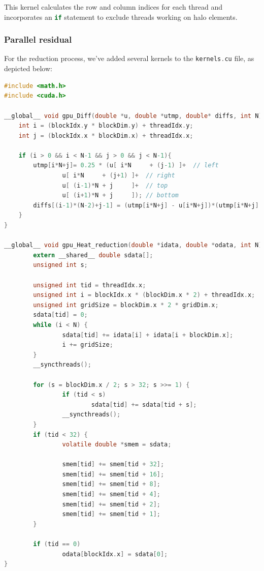 \documentclass[titlepage]{article}
\newcommand{\incode}[1]{\lstinline[style=inlineC,language=C]{#1}}
\begin{document}
This kernel calculates the row and column indices for each thread and incorporates an \incode{if} statement to exclude threads working on halo elements.

\subsubsection{Parallel residual}

For the reduction process, we've added several kernels to the \incode{kernels.cu} file, as depicted below:

\begin{lstlisting}[style=c, language=C, caption=CUDA kernel with reduction, captionpos=b]
#include <math.h>
#include <cuda.h>

__global__ void gpu_Diff(double *u, double *utmp, double* diffs, int N) {
    int i = (blockIdx.y * blockDim.y) + threadIdx.y;
    int j = (blockIdx.x * blockDim.x) + threadIdx.x;

    if (i > 0 && i < N-1 && j > 0 && j < N-1){
        utmp[i*N+j]= 0.25 * (u[ i*N     + (j-1) ]+  // left
                u[ i*N     + (j+1) ]+  // right
                u[ (i-1)*N + j     ]+  // top
                u[ (i+1)*N + j     ]); // bottom
        diffs[(i-1)*(N-2)+j-1] = (utmp[i*N+j] - u[i*N+j])*(utmp[i*N+j] - u[i*N+j]);
    }
}

__global__ void gpu_Heat_reduction(double *idata, double *odata, int N) {
        extern __shared__ double sdata[];
        unsigned int s;

        unsigned int tid = threadIdx.x;
        unsigned int i = blockIdx.x * (blockDim.x * 2) + threadIdx.x;
        unsigned int gridSize = blockDim.x * 2 * gridDim.x;
        sdata[tid] = 0;
        while (i < N) {
                sdata[tid] += idata[i] + idata[i + blockDim.x];
                i += gridSize;
        }
        __syncthreads();

        for (s = blockDim.x / 2; s > 32; s >>= 1) {
                if (tid < s)
                        sdata[tid] += sdata[tid + s];
                __syncthreads();
        }
        if (tid < 32) {
                volatile double *smem = sdata;

                smem[tid] += smem[tid + 32];
                smem[tid] += smem[tid + 16];
                smem[tid] += smem[tid + 8];
                smem[tid] += smem[tid + 4];
                smem[tid] += smem[tid + 2];
                smem[tid] += smem[tid + 1];
        }
        
        if (tid == 0)
                odata[blockIdx.x] = sdata[0];
}
\end{lstlisting}
\end{document}

